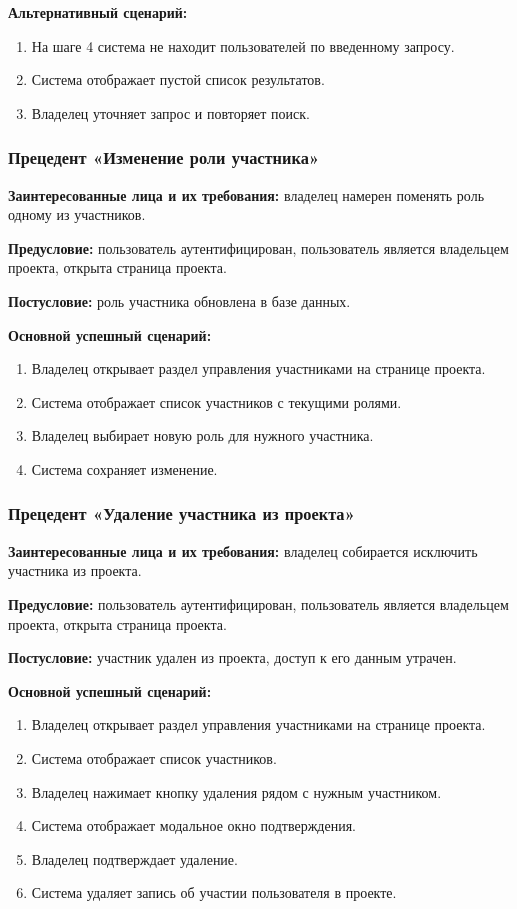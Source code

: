 \textbf{Альтернативный сценарий:}
\begin{enumerate}
    \item На шаге 4 система не находит пользователей по введенному запросу.
    \item Система отображает пустой список результатов.
    \item Владелец уточняет запрос и повторяет поиск.
\end{enumerate}

\subsubsection{Прецедент «Изменение роли участника»}

\textbf{Заинтересованные лица и их требования:} владелец намерен поменять роль одному из участников.

\textbf{Предусловие:} пользователь аутентифицирован, пользователь является владельцем проекта, открыта страница проекта.

\textbf{Постусловие:} роль участника обновлена в базе данных.

\textbf{Основной успешный сценарий:}
\begin{enumerate}
    \item Владелец открывает раздел управления участниками на странице проекта.
    \item Система отображает список участников с текущими ролями.
    \item Владелец выбирает новую роль для нужного участника.
    \item Система сохраняет изменение.
\end{enumerate}

\subsubsection{Прецедент «Удаление участника из проекта»}

\textbf{Заинтересованные лица и их требования:} владелец собирается исключить участника из проекта.

\textbf{Предусловие:} пользователь аутентифицирован, пользователь является владельцем проекта, открыта страница проекта.

\textbf{Постусловие:} участник удален из проекта, доступ к его данным утрачен.

\textbf{Основной успешный сценарий:}
\begin{enumerate}
    \item Владелец открывает раздел управления участниками на странице проекта.
    \item Система отображает список участников.
    \item Владелец нажимает кнопку удаления рядом с нужным участником.
    \item Система отображает модальное окно подтверждения.
    \item Владелец подтверждает удаление.
    \item Система удаляет запись об участии пользователя в проекте.
\end{enumerate}


